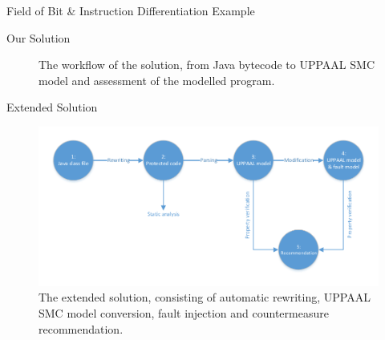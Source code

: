\begin{frame}[fragile]{Field of Bit \& Instruction Differentiation}
Example
\end{frame}

\begin{frame}[fragile]{Our Solution}
\begin{center}
\begin{figure}
\def\svgwidth{\columnwidth}

\caption{The workflow of the solution, from Java bytecode to UPPAAL SMC model and assessment of the modelled program.}
\label{fig:workflow_new}
\end{figure}
\end{center}
\end{frame}


\begin{frame}[fragile]{Extended Solution}


\begin{figure}
\centering
\includegraphics[scale=0.65]{figures/workflow.pdf}
\caption{\footnotesize The extended solution, consisting of automatic rewriting, UPPAAL SMC model conversion, fault injection and countermeasure recommendation.}
\label{test}
\end{figure}
\end{frame}